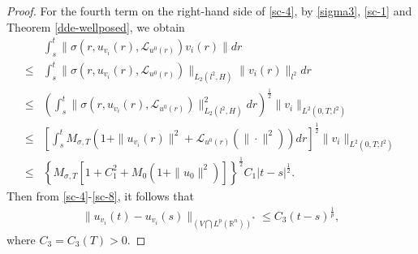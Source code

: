 \documentclass[11pt]{article}
\numberwithin{equation}{section}
\theoremstyle{plain}
\def\leq{\leqslant}
\begin{document}
\begin{proof}
    For the fourth term on the right-hand side of \eqref{sc-4},
    by \eqref{sigma3}, \eqref{sc-1} and Theorem \ref{dde-wellposed}, we obtain
    \begin{align} \label{sc-8}
        & \int_s^t \| \sigma(r, u_{v_i}(r), \mathcal{L}_{u^0(r)} ) v_i(r) \| dr  \nonumber \\
        \leq & \int_s^t \| \sigma(r, u_{v_i}(r), \mathcal{L}_{u^0(r)} ) \|_{L_2(l^2, H)}  \| v_i(r) \|_{l^2} dr  \nonumber \\
        \leq & \left( \int_s^t \| \sigma(r, u_{v_i}(r), \mathcal{L}_{u^0(r)} ) \|_{L_2(l^2, H)}^2 dr \right)^{\frac{1}{2}}
        \| v_i \|_{L^2(0,T; l^2)}  \nonumber \\
        \leq & \left[ \int_s^t M_{\sigma, T}
        \left( 1 + \| u_{v_i}(r)\|^2
        + \mathcal{L}_{u^0(r)}(\|\cdot\|^2)
        \right)
        dr
        \right]^{\frac{1}{2}}
        \| v_i \|_{L^2(0,T; l^2)}  \nonumber \\
        \leq & \left\{ M_{\sigma, T} \left[ 1 + C_1^2 + M_0 \left( 1 + \|u_0\|^2 \right) \right] \right\}^{\frac{1}{2}}
        C_1 |t-s|^{\frac{1}{2}}.
    \end{align}
    Then from \eqref{sc-4}-\eqref{sc-8},
    it follows that
    \begin{align} \label{sc-9}
        \| u_{v_i} (t) - u_{v_i} (s) \|_{\left( V \bigcap L^p(\mathbb{R}^n) \right)^\ast}
        \leq C_3 (t-s)^{\frac{1}{p}},
    \end{align}
    where $C_3 = C_3(T) > 0$.



\end{proof}
\end{document}
